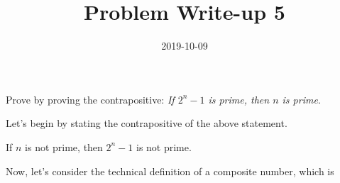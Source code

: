 \documentclass[a4paper,12pt]{article}
\title{Problem Write-up 5}
\date{2019-10-09}
\begin{document}
	\begin{problem}
		Prove by proving the contrapositive: \textit{If \(2^n - 1\) is prime, then \(n\) is prime}.
	\end{problem}
	\begin{answer}
		Let's begin by stating the contrapositive of the above statement.
		\begin{contrapositive}
			If \(n\) is not prime, then \(2^n - 1\) is not prime.
		\end{contrapositive}
		Now, let's consider the technical definition of a composite number, which is 
	\end{answer}
\end{document}
